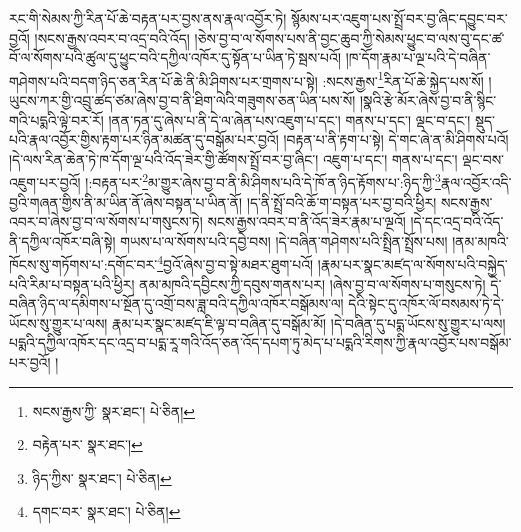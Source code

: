 རང་གི་སེམས་ཀྱི་རིན་པོ་ཆེ་བརྟན་པར་བྱས་ནས་རྣལ་འབྱོར་ཏེ། སྙོམས་པར་འཇུག་པས་སྤྲོ་བར་བྱ་ཞིང་དབྱུང་བར་བྱའོ། །སངས་རྒྱས་འབར་བ་འདྲ་བའི་འོད། །ཅེས་བྱ་བ་ལ་སོགས་པས་ནི་བྱང་ཆུབ་ཀྱི་སེམས་ཕྱུང་བ་ལས་བུ་དང་ཚ་བོ་ལ་སོགས་པའི་ཚུལ་དུ་ཕྱུང་བའི་དཀྱིལ་འཁོར་དུ་སྟོན་པ་ཡིན་ཏེ་སྦས་པའོ། །ཁ་དོག་རྣམ་པ་ལྔ་པའི་དེ་བཞིན་གཤེགས་པའི་བདག་ཉིད་ཅན་རིན་པོ་ཆེ་ནི་མི་ཤིགས་པར་གྲགས་པ་སྟེ། :སངས་རྒྱས་\footnote{སངས་རྒྱས་ཀྱི་  སྣར་ཐང་།  པེ་ཅིན། }རིན་པོ་ཆེ་སྐྱེད་པས་སོ། །ཡུངས་ཀར་གྱི་འབྲུ་ཚད་ཙམ་ཞེས་བྱ་བ་ནི་ཐིག་ལེའི་གཟུགས་ཅན་ཡིན་པས་སོ། །སྣའི་རྩེ་མོར་ཞེས་བྱ་བ་ནི་སྙིང་གའི་པདྨའི་ལྟེ་བར་རོ། །ནན་ཏན་དུ་ཞེས་པ་ནི་དེ་ལ་ཞེན་པས་འཇུག་པ་དང་། གནས་པ་དང་། ལྡང་བ་དང་། སྡུད་པའི་རྣལ་འབྱོར་གྱིས་རྟག་པར་ཉིན་མཚན་དུ་བསྒོམ་པར་བྱའོ། །བརྟན་པ་ནི་རྟག་པ་སྟེ། དེ་གང་ཞེ་ན་མི་ཤིགས་པའོ། །དེ་ལས་རིན་ཆེན་ཏེ་ཁ་དོག་ལྔ་པའི་འོད་ཟེར་གྱི་ཚོགས་སྤྲོ་བར་བྱ་ཞིང་། འཇུག་པ་དང་། གནས་པ་དང་། ལྡང་བས་འཇུག་པར་བྱའོ། །:བརྟན་པར་\footnote{བརྟེན་པར་  སྣར་ཐང་། }མ་གྱུར་ཞེས་བྱ་བ་ནི་མི་ཤིགས་པའི་དེ་ཁོ་ན་ཉིད་རྟོགས་པ་:ཉིད་ཀྱི་\footnote{ཉིད་ཀྱིས་  སྣར་ཐང་།  པེ་ཅིན། }རྣལ་འབྱོར་འདི་བྱའི་གཞན་གྱིས་ནི་མ་ཡིན་ནོ་ཞེས་བསྟན་པ་ཡིན་ནོ། །ད་ནི་སྤྲོ་བའི་ཆོ་ག་བསྟན་པར་བྱ་བའི་ཕྱིར། སངས་རྒྱས་འབར་བ་ཞེས་བྱ་བ་ལ་སོགས་པ་གསུངས་ཏེ། སངས་རྒྱས་འབར་བ་ནི་འོད་ཟེར་རྣམ་པ་ལྔའོ། །དེ་དང་འདྲ་བའི་འོད་ནི་དཀྱིལ་འཁོར་བཞི་སྟེ། གཡས་པ་ལ་སོགས་པའི་དབྱེ་བས། །དེ་བཞིན་གཤེགས་པའི་སྤྲིན་སྤྲོས་པས། །ནམ་མཁའི་ཁོངས་སུ་གཏོགས་པ་:དགོང་བར་\footnote{དགང་བར་  སྣར་ཐང་།  པེ་ཅིན། }བྱའོ་ཞེས་བྱ་བ་སྟེ་མཐར་ཐུག་པའོ། །རྣམ་པར་སྣང་མཛད་ལ་སོགས་པའི་བསྐྱེད་པའི་རིམ་པ་བསྟན་པའི་ཕྱིར། ནམ་མཁའི་དབྱིངས་ཀྱི་དབུས་གནས་པར། །ཞེས་བྱ་བ་ལ་སོགས་པ་གསུངས་ཏེ། དེ་བཞིན་ཉིད་ལ་དམིགས་པ་སྔོན་དུ་འགྲོ་བས་ཟླ་བའི་དཀྱིལ་འཁོར་བསྒོམས་ལ། དེའི་སྟེང་དུ་འཁོར་ལོ་བསམས་ཏེ་དེ་ཡོངས་སུ་གྱུར་པ་ལས། རྣམ་པར་སྣང་མཛད་ཇི་ལྟ་བ་བཞིན་དུ་བསྒོམ་མོ། །དེ་བཞིན་དུ་པདྨ་ཡོངས་སུ་གྱུར་པ་ལས། པདྨའི་དཀྱིལ་འཁོར་དང་འདྲ་བ་པདྨ་རཱ་གའི་འོད་ཅན་འོད་དཔག་ཏུ་མེད་པ་པདྨའི་རིགས་ཀྱི་རྣལ་འབྱོར་པས་བསྒོམ་པར་བྱའོ། །

